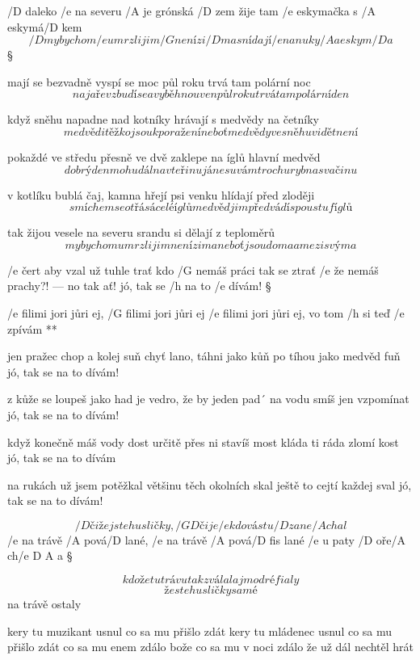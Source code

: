 /D daleko /e na severu /A je grónská /D zem
žije tam /e eskymačka s /A eskymá/D kem
\[ /D my bychom /e umrzli jim /G není zi/D ma
snídají /e nanuky /A a eskym/D a \]\S

mají se bezvadně vyspí se moc
půl roku trvá tam polární noc
\[ na jaře vzbudí se a vyběhnou ven
půl roku trvá tam polární den \]\s

když sněhu napadne nad kotníky
hrávají s medvědy na četníky
\[ medvědi těžko jsou k poražení
neboť medvědy ve sněhu vidět není \]\s

pokaždé ve středu přesně ve dvě
zaklepe na íglů hlavní medvěd
\[ dobrý den mohu dál na vteřinu
já nesu vám trochu ryb na svačinu \]\s

v kotlíku bublá čaj, kamna hřejí
psi venku hlídají před zloději
\[ smíchem se otřásá celé íglů
medvěd jim předvádí spoustu fíglů \]\s

tak žijou vesele na severu
srandu si dělají z teploměrů
\[ my bychom umrzli jim není zima
neboť jsou doma a mezi svýma \]




/e čert aby vzal už tuhle trať
kdo /G nemáš práci tak se ztrať
/e že nemáš prachy?! --- no tak ať!
jó, tak se /h na to /e dívám! \S

\R /e filimi jori jůri ej, /G filimi jori jůri ej
   /e filimi jori jůri ej, vo tom /h si teď /e zpívám **

jen pražec chop a kolej suň
chyť lano, táhni jako kůň
po tíhou jako medvěd fuň
jó, tak se na to dívám! \s

z kůže se loupeš jako had
je vedro, že by jeden pad´
na vodu smíš jen vzpomínat
jó, tak se na to dívám! \s

když konečně máš vody dost
určitě přes ni stavíš most
kláda ti ráda zlomí kost
jó, tak se na to dívám \s

na rukách už jsem potěžkal
většinu těch okolních skal
ještě to cejtí každej sval
jó, tak se na to dívám! \s




\[ /D čiže jste husličky, /{G D} čije
/e kdo vás tu /D zane/A chal \]
/e na trávě /A pová/D lané, /e na trávě /A pová/{D fis} lané
/e u paty /D oře/A ch/{e D A} a \S

\[ kdože tu trávu tak zválal
aj modré fialy \]
\[ že ste husličky samé \]
na trávě ostaly \s

kery tu muzikant usnul
co sa mu přišlo zdát
kery tu mládenec usnul
co sa mu přišlo zdát
co sa mu enem zdálo
bože co sa mu v noci zdálo
že už dál nechtěl hrát \s

